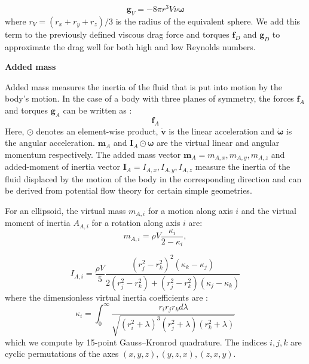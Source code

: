 \documentclass[sn-mathphys-num]{sn-jnl}%
\theoremstyle{thmstyleone}	%
\theoremstyle{thmstyletwo}	%
\theoremstyle{thmstylethree}	%
\begin{document}
\begin{appendices}
\begin{equation}\label{eq:g_V}
	\mathbf{g}_V = -8 \pi r^3 V \nu \mathbf{\omega}
\end{equation}
%
where $ r_V = (r_x + r_y +r_z) / 3 $ is the radius of the equivalent sphere. 
We add this term to the previously defined viscous drag force and torques $ \mathbf{f}_D $ and $ \mathbf{g}_D $ to approximate the drag well for both high and low Reynolds numbers.






\textbf{Added mass}

Added mass measures the inertia of the fluid that is put into motion by the body's motion. 
In the case of a body with three planes of symmetry, the forces $ \mathbf{f}_A $ and torques $ \mathbf{g}_A $ can be written as \cite{birkhoff2015hydrodynamics}:
%
\begin{equation}\label{key}
	\mathbf{f}_A
\end{equation}
%
Here, $ \odot $ denotes an element-wise product, $ \dot{\mathbf{v}} $ is the linear acceleration and $\dot{\mathbf{\omega}}$ is the angular acceleration.
$ \mathbf{m}_A $ and $ \mathbf{I}_A \odot \mathbf{\omega} $ are the virtual linear and angular momentum respectively. 
The added mass vector $ \mathbf{m}_A = { m_{A,x}, m_{A, y}, m_{A, z} } $ and added-moment of inertia vector $ \mathbf{I}_A = {I_{A,x}, I_{A,y}, I_{A,z}} $ measure the inertia of the fluid displaced by the motion of the body in the corresponding direction and can be derived from potential flow theory for certain simple geometries.


For an ellipsoid, the virtual mass $ m_{A, i} $ for a motion along axis $ i $ and the virtual moment of inertia $ A_{A,i} $ for a rotation along axis $ i $ are:
%
\begin{equation}\label{eq:virtual_mass}
	m_{A, i} = 
	\rho
	V
	\frac{\kappa_i}{2-\kappa_i},
\end{equation}

\begin{equation}\label{eq:virtual_inertia}
	I_{A, i} = 
	\frac{\rho V}{5}
	\frac{
		(r_j^2 - r_k^2)^2
		(\kappa_k - \kappa_j)
	}{
		2 (r_j^2 - r_k^2)
		+ (r_j^2 - r_k^2)
		(\kappa_j - \kappa_k)
	}
\end{equation}
where the dimensionless virtual inertia coefficients are \cite{tuckerman1925inertia}:
%
\begin{equation}\label{eq:inertia_coefficient}
	\kappa_i = 
		\int_{0}^{\infty}
		\frac{
			r_i r_j r_k d \lambda
		}{
			\sqrt{
				(r_i^2 + \lambda)^3
				(r_j^2 + \lambda)
				(r_k^2 + \lambda)
			}
		}
\end{equation}
%
which we compute by 15-point Gauss–Kronrod quadrature. 
The indices $ i, j, k $ are cyclic permutations of the axes $ (x, y, z), (y, z, x), (z, x, y) $.



\end{appendices}
\end{document}
